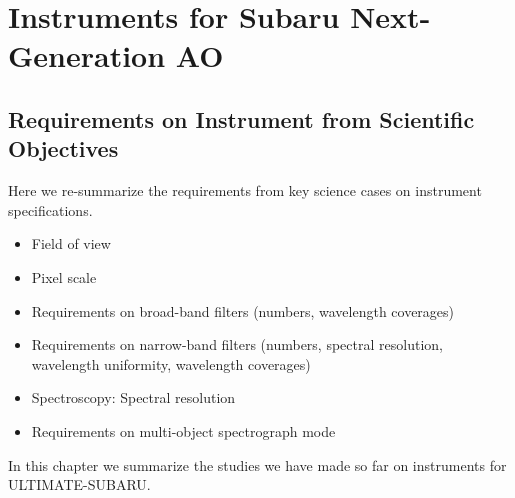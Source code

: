 \def\thisdir{instrument/}

\chapter{Instruments for Subaru Next-Generation AO
\label{chap:inst}}


\section{Requirements on Instrument from Scientific Objectives}

Here we re-summarize the requirements from key science cases on
instrument specifications.

\begin{itemize}
 \item Field of view
 \item Pixel scale
 \item Requirements on broad-band filters (numbers, wavelength coverages)
 \item Requirements on narrow-band filters (numbers, spectral resolution,
      wavelength uniformity, wavelength coverages)
 \item Spectroscopy: Spectral resolution 
 \item Requirements on multi-object spectrograph mode
\end{itemize}

In this chapter we summarize the studies we have made so far on
instruments for ULTIMATE-SUBARU.
